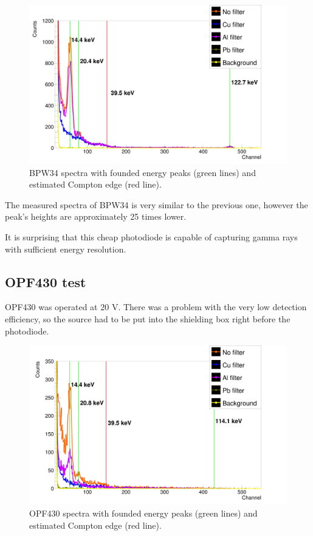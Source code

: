 \begin{figure}[H]
 \centering
 \includegraphics[scale=0.125, angle = 0]{./pictures/BPW34GammaTest.png}
  \caption{BPW34 spectra with founded energy peaks (green lines) and estimated Compton edge (red line).}
 \label{BPW34 spectra}
 
\end{figure}

The measured spectra of BPW34 is very similar to the previous one, however the peak's heights are approximately 25 times lower.

It is surprising that this cheap photodiode is capable of capturing gamma rays with sufficient energy resolution.
\subsection{OPF430 test}
OPF430 was operated at 20 V. There was a problem with the very low detection efficiency, so the source had to be put into the shielding box right before the photodiode.

\begin{figure}[H]
 \centering
 \includegraphics[scale=0.125, angle = 0]{./pictures/OPF430GammaTest.png}
 \caption{OPF430 spectra with founded energy peaks (green lines) and estimated Compton edge (red line).}
 \label{OPF430 spectra}
 
\end{figure}

